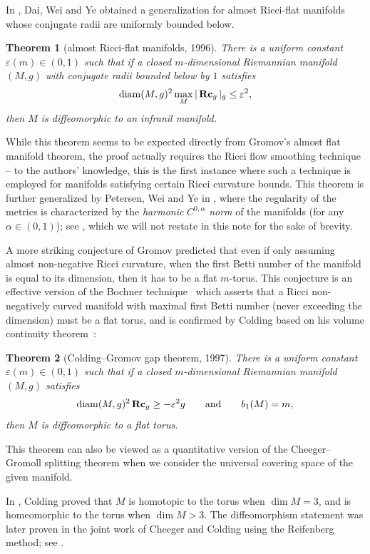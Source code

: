 \documentclass[pdftex]{sigma}
\numberwithin{equation}{section}
\newtheorem{Theorem}{Theorem}[section]
\DeclareMathOperator{\diam}{diam}
\newcommand{\Rc}{\operatorname{\bf Rc}}
\begin{document}
In \cite{DWY96}, Dai, Wei and Ye obtained a generalization for almost Ricci-flat
manifolds whose conjugate radii are uniformly bounded below.
 \begin{Theorem}[almost Ricci-flat manifolds, 1996] \label{thm: DWY96}
 There is a uniform constant $\varepsilon(m)\in (0,1)$ such that if a closed
 $m$-dimensional Riemannian manifold $(M,g)$ with conjugate radii bounded below
 by $1$ satisfies
\begin{align*}
 \diam(M,g)^2\max_M |\Rc_g |_g \le \varepsilon^2,
\end{align*}
then $M$ is diffeomorphic to an infranil manifold.
\end{Theorem}
While this theorem seems to be expected directly from Gromov's almost flat
manifold theorem, the proof actually requires the Ricci flow smoothing technique
-- to the authors' knowledge, this is the first instance where such a technique
is employed for manifolds satisfying certain Ricci curvature bounds. This
theorem is further generalized by Petersen, Wei and Ye in \cite{PWY99}, where
the regularity of the metrics is characterized by the \emph{harmonic}
$C^{0,\alpha}$ \emph{norm} of the manifolds (for any $\alpha\in (0,1)$); see
\cite[Theorem~1.4]{PWY99}, which we will not restate in this note for the sake
of brevity.

A more striking conjecture of Gromov \cite{GLP} predicted that
even if only assuming almost non-negative Ricci curvature, when the first Betti
number of the manifold is equal to its dimension, then it has to be a flat
$m$-torus. This conjecture is an effective version of the Bochner technique~\cite{Bochner, BY} which asserts that a Ricci non-negatively curved manifold
with maximal first Betti number (never exceeding the dimension) must be a flat
torus, and is confirmed by Colding based on his volume continuity theorem~\cite{Colding97}:
\begin{Theorem}[Colding--Gromov gap theorem, 1997]\label{thm: CG97}
There is a uniform constant $\varepsilon(m)\in (0,1)$ such that if a closed
$m$-dimensional Riemannian manifold $(M,g)$ satisfies
\begin{align*}
\diam(M,g)^2\Rc_g \ge -\varepsilon^2 g\qquad \text{and}\qquad b_1(M) = m,
\end{align*}
then $M$ is diffeomorphic to a flat torus.
\end{Theorem}
This theorem can also be viewed as a quantitative version of the Cheeger--Gromoll
splitting theorem \cite{CG71} when we consider the universal covering space of
the given manifold.
\begin{Remark}
In \cite{Colding97}, Colding proved that $M$ is homotopic to the torus when
$\dim M=3$, and is homeomorphic to the torus when $\dim M>3$. The diffeomorphism
statement was later proven in the joint work of Cheeger and Colding using the
Reifenberg method; see \cite[Appendix~A]{ChCoI}.
\end{Remark}
\end{document}
